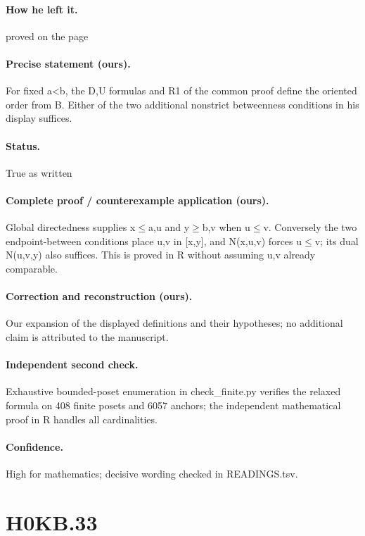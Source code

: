 \paragraph{How he left it.} proved on the page

\paragraph{Precise statement (ours).} For fixed a<b, the D,U formulas and R1 of the common proof define the oriented order from B. Either of the two additional nonstrict betweenness conditions in his display suffices.

\paragraph{Status.} True as written

\paragraph{Complete proof / counterexample application (ours).} Global directedness supplies x\ensuremath{\leq}a,u and y\ensuremath{\geq}b,v when u\ensuremath{\leq}v. Conversely the two endpoint-between conditions place u,v in [x,y], and N(x,u,v) forces u\ensuremath{\leq}v; its dual N(u,v,y) also suffices. This is proved in R without assuming u,v already comparable.

\paragraph{Correction and reconstruction (ours).} Our expansion of the displayed definitions and their hypotheses; no additional claim is attributed to the manuscript.

\paragraph{Independent second check.} Exhaustive bounded-poset enumeration in check\_finite.py verifies the relaxed formula on 408 finite posets and 6057 anchors; the independent mathematical proof in R handles all cardinalities.

\paragraph{Confidence.} High for mathematics; decisive wording checked in READINGS.tsv.

\section*{H0KB.33}\label{statement:H0KB.33}
